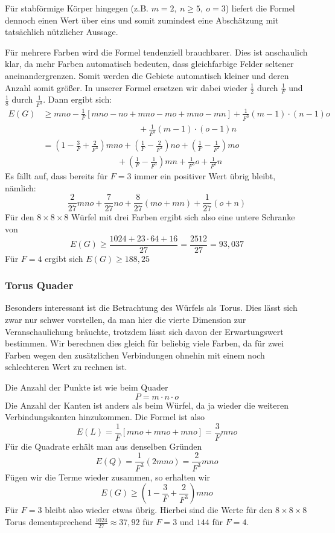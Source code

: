 \documentclass[11pt,a4paper]{article}
\numberwithin{equation}{section}
\numberwithin{table}{section}
\numberwithin{figure}{section}
\begin{document}
\noindent Für stabförmige Körper hingegen (z.B. $m=2,~ n\geq 5,~ o=3$) liefert die Formel dennoch einen Wert über eins und somit zumindest eine Abschätzung mit tatsächlich nützlicher Aussage. \par\noindent
Für mehrere Farben wird die Formel tendenziell brauchbarer. Dies ist anschaulich klar, da mehr Farben automatisch bedeuten, dass gleichfarbige Felder seltener aneinandergrenzen. Somit werden die Gebiete automatisch kleiner und deren Anzahl somit größer. In unserer Formel ersetzen wir dabei wieder $\frac{1}{2}$ durch $\frac{1}{F}$ und $\frac{1}{8}$ durch $\frac{1}{F^3}$. Dann ergibt sich:\small
\begin{align*}
E(G)&\geq mno-\frac{1}{F} [mno-no+mno-mo+mno-mn]+\frac{1}{F^3} (m-1)\cdot(n-1)o\\
&\phantom{blablablablablablablablabla}+\frac{1}{F^3} (m-1)\cdot(o-1)n\\
&=\left(1-\frac{3}{F}+\frac{2}{F^3} \right)mno+\left(\frac{1}{F}-\frac{2}{F^3 }\right)no+\left(\frac{1}{F}-\frac{1}{F^3 }\right)mo\\
&\phantom{blablblablablaablabla}+\left(\frac{1}{F}-\frac{1}{F^3 }\right)mn+\frac{1}{F^3}o+\frac{1}{F^3}n
\end{align*}
\normalsize
Es fällt auf, dass bereits für $F=3$ immer ein positiver Wert übrig bleibt, nämlich:
$$\frac{2}{27} mno+\frac{7}{27}no+\frac{8}{27}(mo+mn)+\frac{1}{27}(o+n)$$
Für den $8\times 8\times 8$ Würfel mit drei Farben ergibt sich also eine untere Schranke von 
$$E(G) \geq \frac{1024+23\cdot64+16}{27}=\frac{2512}{27}=93,037$$
Für $F=4$ ergibt sich $E(G) \geq 188,25$
\subsubsection{Torus Quader}
Besonders interessant ist die Betrachtung des Würfels als Torus. Dies lässt sich zwar nur schwer vorstellen, da man hier die vierte Dimension zur Veranschaulichung bräuchte, trotzdem lässt sich davon der Erwartungswert bestimmen. Wir berechnen dies gleich für beliebig viele Farben, da für zwei Farben wegen den zusätzlichen Verbindungen ohnehin mit einem noch schlechteren Wert zu rechnen ist. \par\noindent
Die Anzahl der Punkte ist wie beim Quader 
$$P=m\cdot n\cdot o$$
Die Anzahl der Kanten ist anders als beim Würfel, da ja wieder die weiteren Verbindungskanten hinzukommen. 
Die Formel ist also 
$$E(L)=\frac{1}{F} [mno+mno+mno]=\frac{3}{F}mno $$
Für die Quadrate erhält man aus denselben Gründen
$$E(Q)=\frac{1}{F^3}(2mno)=\frac{2}{F^3}mno $$
Fügen wir die Terme wieder zusammen, so erhalten wir
$$E(G)\geq\left(1-\frac{3}{F}+\frac{2}{F^3}\right)mno $$
Für $F=3$ bleibt also wieder etwas übrig. Hierbei sind die Werte für den $8\times8\times8$ Torus dementsprechend $\frac{1024}{27}\approx 37,92$ für $F=3$ und $144$ für $F=4$.
\end{document}
